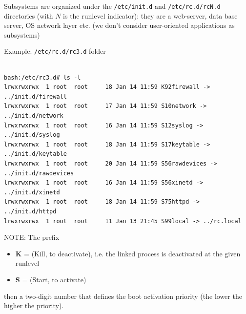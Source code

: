 Subsystems are organized under the \verb!/etc/init.d! and \verb!/etc/rc.d/rcN.d!
directories (with $N$ is the runlevel indicator): they are a web-server, data
base server, OS network layer etc.  (we don't consider user-oriented
applications as subsystems)

Example: \verb!/etc/rc.d/rc3.d! folder
\begin{verbatim}

bash:/etc/rc3.d# ls -l
lrwxrwxrwx  1 root  root     18 Jan 14 11:59 K92firewall -> ../init.d/firewall
lrwxrwxrwx  1 root  root     17 Jan 14 11:59 S10network -> ../init.d/network
lrwxrwxrwx  1 root  root     16 Jan 14 11:59 S12syslog -> ../init.d/syslog
lrwxrwxrwx  1 root  root     18 Jan 14 11:59 S17keytable -> ../init.d/keytable
lrwxrwxrwx  1 root  root     20 Jan 14 11:59 S56rawdevices -> ../init.d/rawdevices
lrwxrwxrwx  1 root  root     16 Jan 14 11:59 S56xinetd -> ../init.d/xinetd
lrwxrwxrwx  1 root  root     18 Jan 14 11:59 S75httpd -> ../init.d/httpd
lrwxrwxrwx  1 root  root     11 Jan 13 21:45 S99local -> ../rc.local
\end{verbatim}

NOTE: The prefix
\begin{itemize}
  \item {\bf K} = (Kill, to deactivate), i.e. the linked process is deactivated
  at the given runlevel 
  
  \item {\bf S} = (Start, to activate)
\end{itemize}
then a two-digit number that defines the boot activation priority (the lower
the higher the priority).

